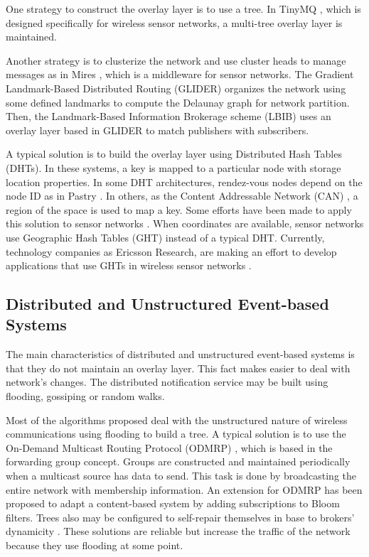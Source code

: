\documentclass[conference]{IEEEtran}
\begin{document}
One strategy to construct the overlay layer is to use a tree. In TinyMQ \cite{shi2011tinymq}, which is designed specifically for wireless sensor networks, a multi-tree overlay layer is maintained. 

Another strategy is to clusterize the network and use cluster heads to manage messages as in Mires \cite{souto2006mires}, which is a middleware for sensor networks. The Gradient Landmark-Based Distributed Routing (GLIDER) \cite{Fang05glider:gradient} organizes the network using some defined landmarks to compute the Delaunay graph for network partition. Then, the Landmark-Based Information Brokerage scheme (LBIB) \cite{Fang06landmark-basedinformation} uses an overlay layer based in GLIDER to match publishers with subscribers. 

A typical solution is to build the overlay layer using Distributed Hash Tables (DHTs). In these systems, a key is mapped to a particular node with storage location properties. In some DHT architectures, rendez-vous nodes depend on the node ID as in Pastry \cite{Pastry}. In others, as the Content Addressable Network (CAN) \cite{CAN}, a region of the space is used to map a key. Some efforts have been made to apply this solution to sensor networks \cite{Fersi:2013:DHT:2429525.2429572}. When coordinates are available, sensor networks use Geographic Hash Tables (GHT) instead of a typical DHT. Currently, technology companies as Ericsson Research, are making an effort to develop applications that use GHTs in wireless sensor networks \cite{SENSORNETS14M3}.


\subsection{Distributed and Unstructured Event-based Systems}

The main characteristics of distributed and unstructured event-based systems is that they do not maintain an overlay layer. This fact makes easier to deal with network's changes. The distributed notification service may be built using flooding, gossiping or random walks.

Most of the algorithms proposed deal with the unstructured nature of wireless communications using flooding to build a tree. A typical solution is to use the On-Demand Multicast Routing Protocol (ODMRP) \cite{Lee:2002}, which is based in the forwarding group concept. Groups are constructed and maintained periodically when a multicast source has data to send. This task is done by broadcasting the entire network with membership information. An extension for ODMRP has been proposed \cite{Yoneki:2004} to adapt a content-based system by adding subscriptions to Bloom filters. Trees also may be configured to self-repair themselves in base to brokers' dynamicity \cite{Mottola:2008}. These solutions are reliable but increase the traffic of the network because they use flooding at some point.
\end{document}
